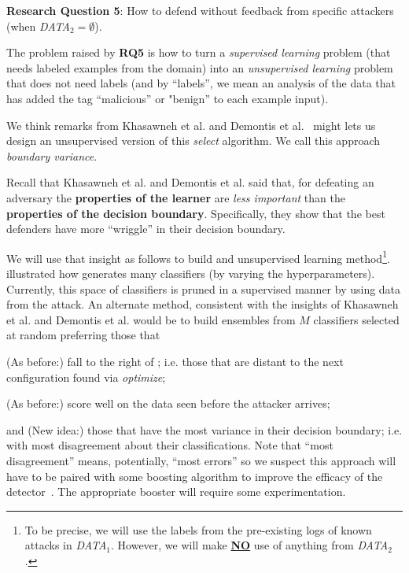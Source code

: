  \begin{blockquote}
\noindent
\textbf{Research Question 5}:  
 How to defend
without   feedback from specific
attackers (when {\em DATA$_2=\emptyset$}).
\end{blockquote} 

The problem raised by {\bf RQ5} is how to turn a {\em supervised learning}
problem (that needs labeled examples from the domain) into an {\em unsupervised
learning} problem that does not need labels (and by ``labels'', we mean an analysis
of the data that has added the tag ``malicious'' or "benign'' to each example input).

We think remarks from  
 Khasawneh et al.\cite{khasawneh2017rhmd} and Demontis et al.~\cite{demontis2019adversarial} might lets us design
 an unsupervised version of this {\em select} algorithm. We call this approach {\em boundary variance}.
 \bi
\item
 Recall that  Khasawneh et al. and Demontis et al.
 said that, for defeating an adversary
  the {\bf properties of the learner} are {\em less important} than 
  the {\bf properties of the decision boundary}.
  Specifically, they show that the best defenders have  more ``wriggle'' in their decision boundary.  
  \item
 We will use that insight as follows to build
 and unsupervised learning method\footnote{To
 be precise, we will use the labels from
 the pre-existing logs of known attacks in 
 {\em DATA}$_1$. However, we will
 make {\underline{\bf NO}} use of 
 anything from  {\em DATA}$_2$.}.  illustrated how {\IT} generates many classifiers (by varying the hyperparameters). Currently, this space of classifiers is pruned in a supervised manner by using data from the attack. An alternate method, consistent with the insights of Khasawneh et al. and Demontis et al.
 would be to  build   ensembles from $M$ classifiers selected at random
 preferring those that
 \bi
 \item 
(As before:) fall to the right of ; i.e. those that are distant to the next configuration found via {\em optimize};
\item
(As before:) score well on the data seen before the attacker arrives;
\item
and (New idea:) those that have the most variance in their decision boundary; i.e.
with most disagreement about their classifications.
\ei
\ei
 Note that  ``most disagreement'' means, potentially, ``most errors'' so we suspect
 this approach will have to be paired with some boosting algorithm to improve the efficacy of the detector~\cite{quinlan96}. The appropriate booster will require some experimentation.
 


